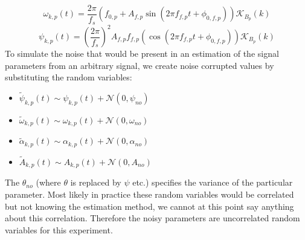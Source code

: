 \begin{equation}
    \omega_{k,p} \left( t \right)  = \frac{2 \pi}{f_{s}}  \left(  f_{0,p} +
    A_{f,p} \sin \left( 2 \pi f_{f,p} t + \phi_{0,f,p} \right)  \right)
    \mathcal{K}_{B_{p}} \left( k \right) 
\end{equation}
\begin{equation}
    \psi_{k,p} \left( t \right)  =  \left( \frac{2 \pi}{f_{s}} \right) ^{2}
    A_{f,p} f_{f,p}  \left(\cos \left( 2 \pi f_{f,p} t +
    \phi_{0,f,p} \right)  \right)  \mathcal{K}_{B_{p}} \left( k \right) 
\end{equation}
To simulate the noise that would be present in an estimation of the signal
parameters from an arbitrary signal, we create noise corrupted values by
substituting the random variables:
\begin{itemize}
    \item
        $\tilde{\psi}_{k,p}(t) \sim
        \psi_{k,p}(t) + \mathcal{N}(0,\psi_{no})$
    \item
        $\tilde{\omega}_{k,p}(t) \sim
        \omega_{k,p}(t) + \mathcal{N}(0,\omega_{no})$
    \item
        $\tilde{\alpha}_{k,p}(t) \sim
        \alpha_{k,p}(t) + \mathcal{N}(0,\alpha_{no})$
    \item
        $\tilde{A}_{k,p}(t) \sim
        A_{k,p}(t) + \mathcal{N}(0,A_{no})$
\end{itemize}
The $\theta_{no}$ (where $\theta$ is replaced by $\psi$ etc.) specifies the
variance of the particular parameter. Most likely in practice these random
variables would be correlated but not knowing the estimation method, we cannot
at this point say anything about this correlation. Therefore the noisy
parameters are uncorrelated random variables for this experiment.

